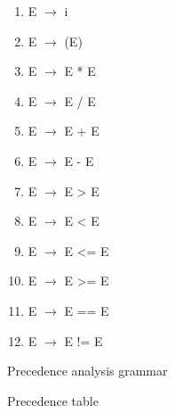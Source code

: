 \documentclass[a4paper, 11pt]{article}
\begin{document}
\begin{figure}[ht]
    \begin{center}
    \begin{enumerate}
        \itemsep-0.5em
        \item E $\to$ i 
        \item E $\to$ (E) 
        \item E $\to$ E * E 
        \item E $\to$ E / E
        \item E $\to$ E + E
        \item E $\to$ E - E
        \item E $\to$ E > E
        \item E $\to$ E < E
        \item E $\to$ E <= E
        \item E $\to$ E >= E
        \item E $\to$ E == E
        \item E $\to$ E != E
    \end{enumerate}
    \caption{Precedence analysis grammar}
    \label{Precedence_grammar}
\end{center}
\end{figure}


\begin{figure}[ht]
    \begin{center}
        \caption{Precedence table}
        \label{prectable}
    \end{center}
\end{figure}
\end{document}

